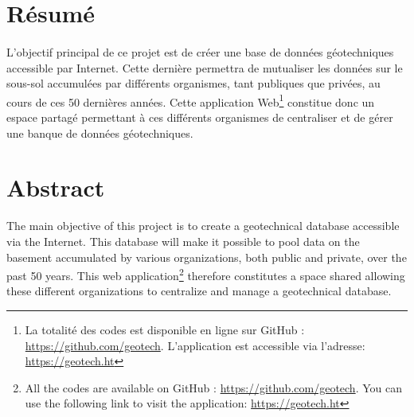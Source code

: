 \section{Résumé}
\paragraph{}
L'objectif principal de ce projet est de créer une base de données géotechni\-ques
 accessible par Internet. Cette dernière permettra de mutualiser les données 
 sur le sous-sol accumulées par différents organismes, tant publiques que privées, 
 au cours de ces 50 dernières années. Cette application 
 Web\footnote{ La totalité des codes est disponible en ligne sur GitHub : \url{https://github.com/geotech}.
 L’application est accessible via l’adresse: \url{https://geotech.ht}}
  constitue donc un espace 
 partagé permettant à ces différents organismes de centraliser et de gérer une banque 
 de données géotechniques.


\newpage
\section{Abstract}
The main objective of this project is to create a geotechnical 
database accessible via the Internet. This database will make it possible to pool data
 on the basement accumulated by various organizations, both public and private,
 over the past 50 years. This web application\footnote{ All the codes are available on GitHub : \url{https://github.com/geotech}.
 You can use the following link to visit the application: \url{https://geotech.ht}} therefore constitutes a space
 shared allowing these different organizations to centralize and manage a
 geotechnical database.
